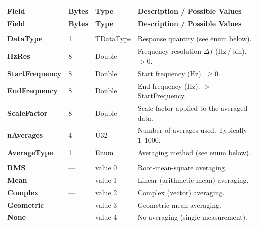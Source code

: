 \documentclass[11pt, oneside]{article}   	%
\begin{document}
\vspace{0.5em}
 
\begin{longtable}{%
  >{\bfseries}p{3.8cm}
  p{1.6cm}
  p{3.0cm}
  p{5.6cm}
}
 
\toprule
\rowcolor{headerblue}
\color{white}\normalfont\bfseries Field &
\color{white}\bfseries Bytes &
\color{white}\bfseries Type &
\color{white}\bfseries Description / Possible Values \\
\midrule
\endfirsthead
 
\toprule
\rowcolor{headerblue}
\color{white}\normalfont\bfseries Field &
\color{white}\bfseries Bytes &
\color{white}\bfseries Type &
\color{white}\bfseries Description / Possible Values \\
\midrule
\endhead
 
\bottomrule
\endfoot
 
\multicolumn{4}{l}{\itshape\small\textbf{Header}} \\[2pt]
\rowcolor{sectiongray}
DataType        & 1  & TDataType & Response quantity (see enum below). \\
\rowcolor{rowlight}
HzRes           & 8  & Double   & Frequency resolution $\Delta f$ (Hz\,/\,bin). $> 0$. \\
StartFrequency  & 8  & Double   & Start frequency (Hz). $\geq 0$. \\
\rowcolor{rowlight}
EndFrequency    & 8  & Double   & End frequency (Hz). $>$ StartFrequency. \\
ScaleFactor     & 8  & Double   & Scale factor applied to the averaged data. \\
\rowcolor{rowlight}
nAverages       & 4  & U32      & Number of averages used. Typically 1--1000. \\
AverageType     & 1  & Enum     & Averaging method (see enum below). \\[6pt]
  
\multicolumn{4}{l}{\itshape\small\textbf{AverageType} \textnormal{enum values}} \\[2pt]
\rowcolor{rowlight}
\quad RMS       & --- & value 0 & Root-mean-square averaging. \\
\quad Mean      & --- & value 1 & Linear (arithmetic mean) averaging. \\
\rowcolor{rowlight}
\quad Complex   & --- & value 2 & Complex (vector) averaging. \\
\quad Geometric & --- & value 3 & Geometric mean averaging. \\
\rowcolor{rowlight}
\quad None      & --- & value 4 & No averaging (single measurement). \\[6pt]
 

\end{longtable}
\end{document}
